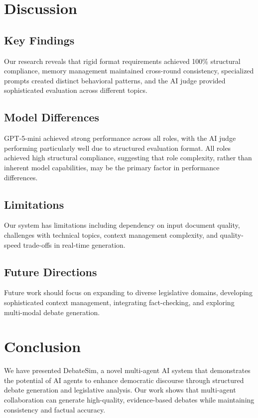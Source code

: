 \documentclass{article}
\begin{document}
\section{Discussion}

\subsection{Key Findings}

Our research reveals that rigid format requirements achieved 100\% structural compliance, memory management maintained cross-round consistency, specialized prompts created distinct behavioral patterns, and the AI judge provided sophisticated evaluation across different topics.

\subsection{Model Differences}

GPT-5-mini achieved strong performance across all roles, with the AI judge performing particularly well due to structured evaluation format. All roles achieved high structural compliance, suggesting that role complexity, rather than inherent model capabilities, may be the primary factor in performance differences.

\subsection{Limitations}

Our system has limitations including dependency on input document quality, challenges with technical topics, context management complexity, and quality-speed trade-offs in real-time generation.

\subsection{Future Directions}

Future work should focus on expanding to diverse legislative domains, developing sophisticated context management, integrating fact-checking, and exploring multi-modal debate generation.


\section{Conclusion}

We have presented DebateSim, a novel multi-agent AI system that demonstrates the potential of AI agents to enhance democratic discourse through structured debate generation and legislative analysis. Our work shows that multi-agent collaboration can generate high-quality, evidence-based debates while maintaining consistency and factual accuracy.
\end{document}
